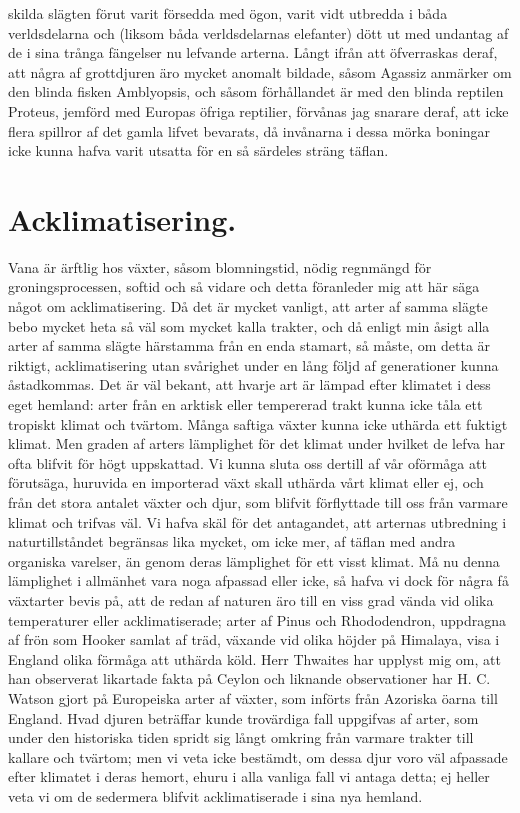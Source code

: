 skilda slägten förut varit försedda med ögon, varit vidt utbredda i båda verldsdelarna och (liksom båda verldsdelarnas elefanter) dött ut med undantag af de i sina trånga fängelser nu lefvande arterna. Långt ifrån att öfverraskas deraf, att några af grottdjuren äro mycket anomalt bildade, såsom Agassiz anmärker om den blinda fisken Amblyopsis, och såsom förhållandet är med den blinda reptilen Proteus, jemförd med Europas öfriga reptilier, förvånas jag snarare deraf, att icke flera spillror af det gamla lifvet bevarats, då invånarna i dessa mörka boningar icke kunna hafva varit utsatta för en så särdeles sträng täflan.



\section{Acklimatisering.}

Vana är ärftlig hos växter, såsom blomningstid, nödig regnmängd för groningsprocessen, softid och så vidare och detta föranleder mig att här säga något om acklimatisering. Då det är mycket vanligt, att arter af samma slägte bebo mycket heta så väl som mycket kalla trakter, och då enligt min åsigt alla arter af samma slägte härstamma från en enda stamart, så måste, om detta är riktigt, acklimatisering utan svårighet under en lång följd af generationer kunna åstadkommas. Det är väl bekant, att hvarje art är lämpad efter klimatet i dess eget hemland: arter från en arktisk eller tempererad trakt kunna icke tåla ett tropiskt klimat och tvärtom. Många saftiga växter kunna icke uthärda ett fuktigt klimat. Men graden af arters lämplighet för det klimat under hvilket de lefva har ofta blifvit för högt uppskattad. Vi kunna sluta oss dertill af vår oförmåga att förutsäga, huruvida en importerad växt skall uthärda vårt klimat eller ej, och från det stora antalet växter och djur, som blifvit förflyttade till oss från varmare klimat och trifvas väl. Vi hafva skäl för det antagandet, att arternas utbredning i naturtillståndet begränsas lika mycket, om icke mer, af täflan med andra organiska varelser, än genom deras lämplighet för ett visst klimat. Må nu denna lämplighet i allmänhet vara noga afpassad eller icke, så hafva vi dock för några få växtarter bevis på, att de redan af naturen äro till en viss grad vända vid olika temperaturer eller acklimatiserade; arter af Pinus och Rhododendron, uppdragna af frön som Hooker samlat af träd, växande vid olika höjder på Himalaya, visa i England olika förmåga att uthärda köld. Herr Thwaites har upplyst mig om, att han observerat likartade fakta på Ceylon och liknande observationer har H. C. Watson gjort på Europeiska arter af växter, som införts från Azoriska öarna till England. Hvad djuren beträffar kunde trovärdiga fall uppgifvas af arter, som under den historiska tiden spridt sig långt omkring från varmare trakter till kallare och tvärtom; men vi veta icke bestämdt, om dessa djur voro väl afpassade efter klimatet i deras hemort, ehuru i alla vanliga fall vi antaga detta; ej heller veta vi om de sedermera blifvit acklimatiserade i sina nya hemland.

